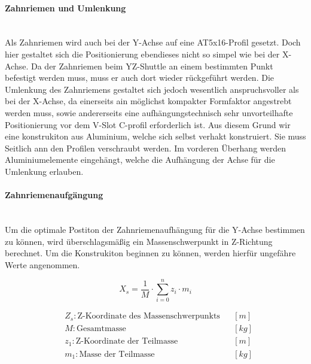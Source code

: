 \paragraph{Zahnriemen und Umlenkung}\mbox{}\\
Als Zahnriemen wird auch bei der Y-Achse auf eine AT5x16-Profil gesetzt. Doch hier gestaltet sich die Positionierung ebendieses nicht so simpel wie bei der X-Achse. Da der Zahnriemen beim YZ-Shuttle an einem bestimmten Punkt befestigt werden muss, muss er auch dort wieder rückgeführt werden. Die Umlenkung des Zahnriemens gestaltet sich jedoch wesentlich anspruchsvoller als bei der X-Achse, da einerseits ain möglichst kompakter Formfaktor angestrebt werden muss, sowie andererseits eine aufhängungstechnisch sehr unvorteilhafte Positionierung vor dem V-Slot C-profil erforderlich ist. Aus diesem Grund wir eine konstrukiton aus Aluminium, welche sich selbst verhakt konstruiert. Sie muss Seitlich ann den Profilen verschraubt werden. Im vorderen Überhang werden Aluminiumelemente eingehängt, welche die Aufhängung der Achse für die Umlenkung erlauben. 

\paragraph{Zahnriemenaufgängung}\mbox{}\\
Um die optimale Postiton der Zahnriemenaufhängung für die Y-Achse bestimmen zu können, wird überschlagsmäßig ein Massenschwerpunkt in Z-Richtung berechnet. Um die Konstrukiton beginnen zu können, werden hierfür ungefähre Werte angenommen.

\noindent\begin{minipage}{\textwidth}
\begin{minipage}[t]{0.5\textwidth}
    \vspace{7mm}
    \begin{equation*}
        X_s = \frac{1}{M} \cdot \displaystyle\sum_{i = 0}^{n} z_i \cdot m_i
    \end{equation*}
\end{minipage}%
\begin{minipage}[t]{0.5\textwidth}
    \begin{align*}
        &Z_s: \text{Z-Koordinate des Massenschwerpunkts} & &\left[m\right]\\
        &M: \text{Gesamtmasse} & &\left[kg\right]\\
        &z_1: \text{Z-Koordinate der Teilmasse} & &\left[m\right] \\
        &m_1: \text{Masse der Teilmasse} & &\left[kg\right]
    \end{align*}
\end{minipage}
\end{minipage}

